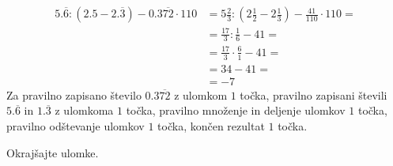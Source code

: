 \documentclass[addpoints]{exam}
\begin{document}
\begin{questions}
\begin{parts}
        \begin{solution}[4cm]
            \begin{align*}
                5.\overline{6}:(2.5-2.\overline{3}) - 0.3\overline{72}\cdot 110&=5\frac{2}{3}:(2\frac{1}{2}-2\frac{1}{3})- \frac{41}{110}\cdot 110 = \\
                                                                            &=\frac{17}{3}:\frac{1}{6}-41= \\
                                                                            &=\frac{17}{3}\cdot \frac{6}{1}-41= \\
                                                                            &=34-41= \\
                                                                            &= -7
            \end{align*}
            Za pravilno zapisano število $0.3\overline{72}$ z ulomkom $1$ točka, pravilno zapisani števili $5.\overline{6}$ in $1.\overline{3}$ z ulomkoma $1$ točka, pravilno množenje in deljenje ulomkov $1$ točka, pravilno odštevanje ulomkov $1$ točka, končen rezultat $1$ točka.
        \end{solution}

    \end{parts}



    \newpage

    \question
    Okrajšajte ulomke.
\end{questions}
\end{document}
